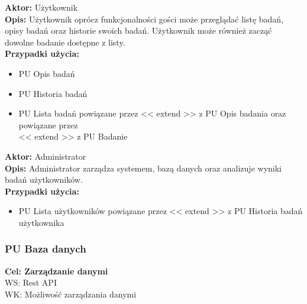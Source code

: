 \documentclass[12pt, letterpaper]{article}
\begin{document}
		\vspace{1cm}
		
		\textbf{Aktor:} Użytkownik\\
		
		\textbf{Opis:} Użytkownik oprócz funkcjonalności gości może przeglądać listę badań, opisy badań oraz historie swoich badań. Użytkownik może również zacząć dowolne badanie dostępne z listy.\\
		
		\textbf{Przypadki użycia:}
		
		\begin{itemize}
			\item PU Opis badań
			\item PU Historia badań
			\item PU Lista badań powiązane przez << extend >> z PU Opis badania oraz powiązane przez\\ << extend >> z PU Badanie
		\end{itemize}
		
		\vspace{1cm}
		
		\textbf{Aktor:} Administrator\\
		
		\textbf{Opis:} Administrator zarządza systemem, bazą danych oraz analizuje wyniki badań użytkowników.\\
		
		\textbf{Przypadki użycia:}
		
		\begin{itemize}
			\item PU Lista użytkowników powiązane przez << extend >> z PU Historia badań użytkownika
		\end{itemize}		
		
		\newpage
		
		
		\subsubsection{PU Baza danych}
		
		\quad
		
		\textbf{Cel: Zarządzanie danymi}\\
		
		WS: Rest API\\
		
		WK: Możliwość zarządzania danymi\\
		
\end{document}
